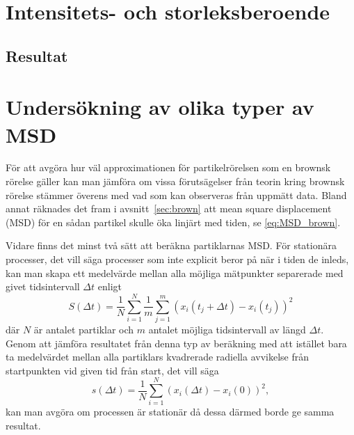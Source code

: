     




\section{Intensitets- och storleksberoende}


\subsection{Resultat}






\section{Undersökning av olika typer av MSD}

För att avgöra hur väl approximationen för partikelrörelsen som en brownsk rörelse gäller kan man jämföra om vissa förutsägelser från teorin kring brownsk rörelse stämmer överens med vad som kan observeras från uppmätt data. Bland annat räknades det fram i avsnitt~\ref{sec:brown} att mean square displacement (MSD) för en sådan partikel skulle öka linjärt med tiden, se \eqref{eq:MSD_brown}.

Vidare finns det minst två sätt att beräkna partiklarnas MSD. För stationära processer, det vill säga processer som inte explicit beror på när i tiden de inleds, kan man skapa ett medelvärde mellan alla möjliga mätpunkter separerade med givet tidsintervall $\Delta{t}$ enligt
\begin{equation} \label{eq:MSD_S}
    S(\Delta t)= \frac{1}{N}\sum^N_{i=1}\frac{1}{m}\sum^m_{j=1}(x_i(t_j+\Delta t)-x_i(t_j))^2
\end{equation} 
där $N$ är antalet partiklar och $m$ antalet möjliga tidsintervall av längd $\Delta t$.
Genom att jämföra resultatet från denna typ av beräkning med att istället bara ta medelvärdet mellan alla partiklars kvadrerade radiella avvikelse från startpunkten vid given tid från start, det vill säga
\begin{equation} \label{eq:MSD_s}%
    s(\Delta t)= \frac{1}{N}\sum^N_{i=1}(x_i(\Delta t)-x_i(0))^2,
\end{equation} 
kan man avgöra om processen är stationär då dessa därmed borde ge samma resultat. 

